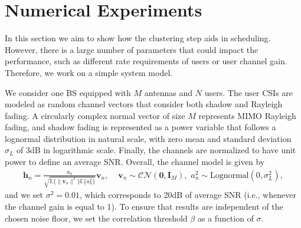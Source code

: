 \section{Numerical Experiments}\label{sec:USCH_sim}
In this section we aim to show how the clustering step aids in scheduling. However, there is a large number of parameters that could impact the performance, such as different rate requirements of users or user channel gain. Therefore, we work on a simple system model.


We consider one BS equipped with $M$ antennas and $N$ users. The user CSIs are modeled as random channel vectors that consider both shadow and Rayleigh fading. A circularly complex normal vector of size $M$ represents MIMO Rayleigh fading, and shadow fading is represented as a power variable that follows a lognormal distribution in natural scale, with zero mean and standard deviation $\sigma_L$ of 3dB in logarithmic scale. Finally, the channels are normalized to have unit power to define an average SNR. Overall, the channel model is given by
\begin{align}
	\bm{h}_n=\frac{a_n}{\sqrt{\mathbb{E}\{\|\bm{v}_n\|^2\}\mathbb{E}\{a_n^2\}}}\bm{v}_n,\,\, &\bm{v}_n\sim\mathcal{CN}(\bm{0},\bm{I}_M),
	\,\,
	a_n^2\sim\mathrm{Lognormal}(0,\sigma_L^2),
	\label{eqn:channel_model}   
\end{align}
and we set $\sigma^2=0.01$, which corresponds to 20dB of average SNR (i.e., whenever the channel gain is equal to 1). To ensure that results are independent of the chosen noise floor, we set the correlation threshold $\beta$ as a function of $\sigma$. 


